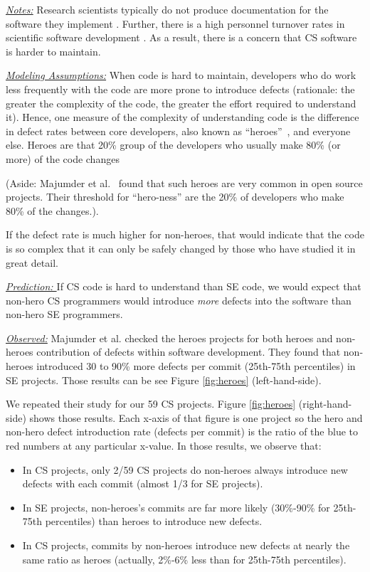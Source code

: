 \documentclass[sigconf]{acmart}
\newcommand{\bi}{\begin{itemize}}
\newcommand{\ei}{\end{itemize}}
\begin{document}
\noindent \textit{\underline{Notes:}} Research scientists typically do not produce documentation for the software they implement \cite{segal07_enduser, sanders08_risk}.
Further, there is a high personnel turnover rates in scientific software development \cite{carver06_hpc, segal07_problem}. As a result, there is a concern that CS software is harder to maintain. 

\noindent \textit{\underline{Modeling Assumptions:}} 
When code is hard to maintain,
developers who do work less frequently with the code are more prone to introduce defects
(rationale: the greater the complexity of the code, the greater the effort required to understand it).
Hence, one measure of the complexity of understanding code
is the difference in defect rates between core developers, also known as ``heroes''~\cite{agrawal2018we, goeminne2011evidence, torres2011analysis, robles2009evolution}, and everyone else.
Heroes are that  20\% group of the developers who usually make 80\% (or more) of the code changes

(Aside:   Majumder et al.~\cite{majumder19_heroes} found that such heroes are very common in open source projects. Their threshold for ``hero-ness'' are the 20\% of developers
who make 80\% of the changes.).

If the defect rate is much higher for non-heroes, that would
indicate that the code is so complex that it can only
be safely changed by those who have studied it in great detail.


\noindent \textit{\underline{Prediction: }} If CS code is hard to understand than SE code, we would expect that non-hero CS programmers would
introduce {\em more} defects into the software than non-hero SE programmers. 




\noindent \textit{\underline{Observed:}} Majumder et al. \cite{majumder19_heroes} checked the heroes projects for both heroes and non-heroes contribution of defects within software development. They found that non-heroes introduced 30 to 90\% more defects per commit (25th-75th percentiles) in SE projects. Those
results can be see Figure \ref{fig:heroes} (left-hand-side).

We repeated their study for our 59 CS projects.  Figure \ref{fig:heroes} (right-hand-side)
shows those results. Each x-axis of that figure is one project so the hero and non-hero defect introduction rate (defects per commit) is the ratio of the blue to red numbers
at any particular x-value.
In those results, we observe that:
\bi
\item In CS projects, only 2/59 CS projects do non-heroes always introduce new defects with each commit (almost 1/3 for SE projects).
\item In SE projects, non-heroes's commits are far more likely (30\%-90\% for 25th-75th percentiles) than heroes to introduce new defects.
\item In CS projects, commits by non-heroes introduce new defects at nearly the same ratio as heroes (actually, 2\%-6\% less than for 25th-75th percentiles).
\ei
 
\end{document}

